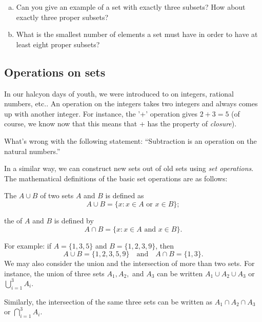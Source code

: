 \begin{exercise}{7}
\begin{enumerate}[(a)]
\item
Can you give an example of a set with exactly three subsets? How about exactly three proper subsets?
\item
What is the smallest number of elements a set must have in order to have at least eight proper subsets?
\end{enumerate}
\end{exercise}

\subsection{Operations on sets}
In our halcyon days of youth, we were introduced to  on integers, rational numbers, etc.. An operation on the integers takes two integers and always comes up with another integer. For instance, the '+' operation gives $2+3=5$ (of course, we know now that this means that + has the property of \emph{closure}).

\begin{exercise}{}
What's wrong with the following statement: ``Subtraction is an operation on the natural numbers.''
\end{exercise}

In a similar way, we can construct new sets out of old sets using \emph{set operations}. The mathematical definitions of the basic set operations are as follows:

\begin{defn}
The  $A \cup B$ of two sets $A$ and $B$ is defined as  
\[
A \cup B\label{union} = \{x : x \in A \text{ or } x \in B \};
\]
\end{defn}
\begin{defn}
the  of $A$ and $B$  is defined by 
\[
A \cap B\label{intersection} = \{x :  x \in A \text{ and } x \in B \}.
\]
\end{defn}
For example: if $A = \{1, 3, 5\}$ and $B = \{ 1, 2, 3, 9 \}$, then
\[
A \cup B = \{1, 2, 3, 5, 9 \}
\quad \text{and} \quad
A \cap B = \{ 1, 3 \}.
\]
We may also consider the union and the intersection of more than two sets.  For instance,  the union of three sets $A_1, A_2,$ and $A_3$ can be written   $A_{1} \cup A_2 \cup A_3$ or $\bigcup_{i = 1}^{3} A_{i}. $ 

\medskip{}
Similarly, the intersection of the same three sets can be written as $A_{1} \cap A_2 \cap A_3$ or $\bigcap_{i = 1}^{3} A_i.$

